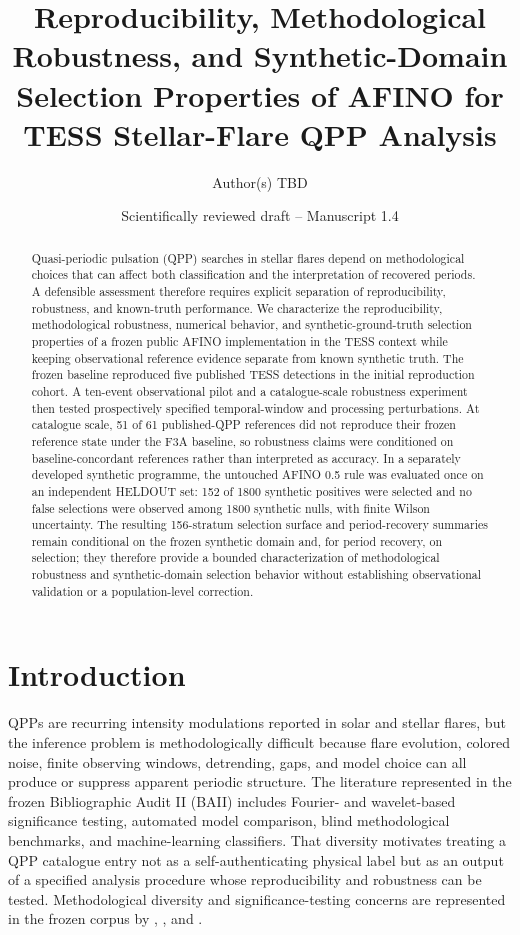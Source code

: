\documentclass[11pt,a4paper]{article}
\title{Reproducibility, Methodological Robustness, and Synthetic-Domain Selection Properties of AFINO for TESS Stellar-Flare QPP Analysis}
\author{Author(s) TBD}
\date{Scientifically reviewed draft -- Manuscript 1.4}
\begin{document}
\maketitle
\begin{abstract}
Quasi-periodic pulsation (QPP) searches in stellar flares depend on methodological choices that can affect both classification and the interpretation of recovered periods. A defensible assessment therefore requires explicit separation of reproducibility, robustness, and known-truth performance. We characterize the reproducibility, methodological robustness, numerical behavior, and synthetic-ground-truth selection properties of a frozen public AFINO implementation in the TESS context while keeping observational reference evidence separate from known synthetic truth. The frozen baseline reproduced five published TESS detections in the initial reproduction cohort. A ten-event observational pilot and a catalogue-scale robustness experiment then tested prospectively specified temporal-window and processing perturbations. At catalogue scale, 51 of 61 published-QPP references did not reproduce their frozen reference state under the F3A baseline, so robustness claims were conditioned on baseline-concordant references rather than interpreted as accuracy. In a separately developed synthetic programme, the untouched AFINO 0.5 rule was evaluated once on an independent HELDOUT set: 152 of 1800 synthetic positives were selected and no false selections were observed among 1800 synthetic nulls, with finite Wilson uncertainty. The resulting 156-stratum selection surface and period-recovery summaries remain conditional on the frozen synthetic domain and, for period recovery, on selection; they therefore provide a bounded characterization of methodological robustness and synthetic-domain selection behavior without establishing observational validation or a population-level correction.
\end{abstract}

\section{Introduction}
QPPs are recurring intensity modulations reported in solar and stellar flares, but the inference problem is methodologically difficult because flare evolution, colored noise, finite observing windows, detrending, gaps, and model choice can all produce or suppress apparent periodic structure. The literature represented in the frozen Bibliographic Audit II (BAII) includes Fourier- and wavelet-based significance testing, automated model comparison, blind methodological benchmarks, and machine-learning classifiers. That diversity motivates treating a QPP catalogue entry not as a self-authenticating physical label but as an output of a specified analysis procedure whose reproducibility and robustness can be tested. Methodological diversity and significance-testing concerns are represented in the frozen corpus by \citet{Inglis2016}, \citet{Pugh2017}, and \citet{Broomhall2019}.
\end{document}
